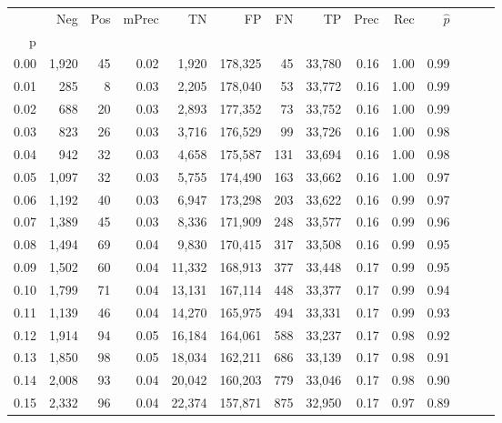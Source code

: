 \begin{tabular}{rrrrrrrrrrrrrr}
\toprule
{} &    Neg &  Pos & mPrec &       TN &       FP &      FN &      TP &  Prec &   Rec & $\hat{p}$ \\
p    &        &      &       &          &          &         &         &       &       &           \\
\midrule
0.00 &  1,920 &   45 &  0.02 &    1,920 &  178,325 &      45 &  33,780 &  0.16 &  1.00 &      0.99 \\
0.01 &    285 &    8 &  0.03 &    2,205 &  178,040 &      53 &  33,772 &  0.16 &  1.00 &      0.99 \\
0.02 &    688 &   20 &  0.03 &    2,893 &  177,352 &      73 &  33,752 &  0.16 &  1.00 &      0.99 \\
0.03 &    823 &   26 &  0.03 &    3,716 &  176,529 &      99 &  33,726 &  0.16 &  1.00 &      0.98 \\
0.04 &    942 &   32 &  0.03 &    4,658 &  175,587 &     131 &  33,694 &  0.16 &  1.00 &      0.98 \\
0.05 &  1,097 &   32 &  0.03 &    5,755 &  174,490 &     163 &  33,662 &  0.16 &  1.00 &      0.97 \\
0.06 &  1,192 &   40 &  0.03 &    6,947 &  173,298 &     203 &  33,622 &  0.16 &  0.99 &      0.97 \\
0.07 &  1,389 &   45 &  0.03 &    8,336 &  171,909 &     248 &  33,577 &  0.16 &  0.99 &      0.96 \\
0.08 &  1,494 &   69 &  0.04 &    9,830 &  170,415 &     317 &  33,508 &  0.16 &  0.99 &      0.95 \\
0.09 &  1,502 &   60 &  0.04 &   11,332 &  168,913 &     377 &  33,448 &  0.17 &  0.99 &      0.95 \\
0.10 &  1,799 &   71 &  0.04 &   13,131 &  167,114 &     448 &  33,377 &  0.17 &  0.99 &      0.94 \\
0.11 &  1,139 &   46 &  0.04 &   14,270 &  165,975 &     494 &  33,331 &  0.17 &  0.99 &      0.93 \\
0.12 &  1,914 &   94 &  0.05 &   16,184 &  164,061 &     588 &  33,237 &  0.17 &  0.98 &      0.92 \\
0.13 &  1,850 &   98 &  0.05 &   18,034 &  162,211 &     686 &  33,139 &  0.17 &  0.98 &      0.91 \\
0.14 &  2,008 &   93 &  0.04 &   20,042 &  160,203 &     779 &  33,046 &  0.17 &  0.98 &      0.90 \\
0.15 &  2,332 &   96 &  0.04 &   22,374 &  157,871 &     875 &  32,950 &  0.17 &  0.97 &      0.89 \\

\end{tabular}
